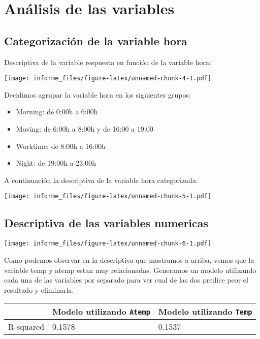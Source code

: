 \documentclass[
]{article}
\providecommand{\tightlist}{%
  \setlength{\itemsep}{0pt}\setlength{\parskip}{0pt}}
\begin{document}
\hypertarget{anuxe1lisis-de-las-variables}{%
\section{Análisis de las variables}\label{anuxe1lisis-de-las-variables}}

\hypertarget{categorizaciuxf3n-de-la-variable-hora}{%
\subsection{Categorización de la variable
hora}\label{categorizaciuxf3n-de-la-variable-hora}}

Descriptiva de la variable respuesta en función de la variable hora:

\texttt{[image: informe\_files/figure-latex/unnamed-chunk-4-1.pdf]}

Decidimos agrupar la variable hora en los siguientes grupos:

\begin{itemize}
\tightlist
\item
  Morning: de 0:00h a 6:00h
\item
  Moving: de 6:00h a 8:00h y de 16:00 a 19:00
\item
  Worktime: de 8:00h a 16:00h
\item
  Night: de 19:00h a 23:00h
\end{itemize}

A continuación la descriptiva de la variable hora categorizada:

\texttt{[image: informe\_files/figure-latex/unnamed-chunk-5-1.pdf]}

\hypertarget{descriptiva-de-las-variables-numericas}{%
\subsection{Descriptiva de las variables
numericas}\label{descriptiva-de-las-variables-numericas}}

\texttt{[image: informe\_files/figure-latex/unnamed-chunk-6-1.pdf]}

Como podemos observar en la descriptiva que mostramos a arriba, vemos
que la variable temp y atemp estan muy relacionadas. Generamos un modelo
utilizando cada una de las variables por separado para ver cual de las
dos predice peor el resultado y eliminarla.

\begin{longtable}[]{@{}lll@{}}
\toprule
& Modelo utilizando \texttt{Atemp} & Modelo utilizando
\texttt{Temp}\tabularnewline
\midrule
\endhead
R-squared & 0.1578 & 0.1537\tabularnewline
\bottomrule
\end{longtable}
\end{document}
